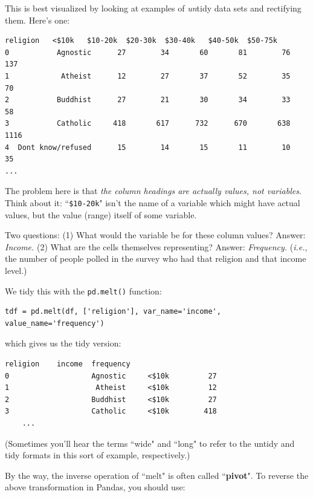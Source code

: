 \documentclass[12pt]{article}
\begin{document}
\vspace{.2in}
This is best visualized by looking at examples of \textit{un}tidy data sets
and rectifying them. Here's one:
\small
\begin{Verbatim}[fontsize=small,samepage=true,frame=none]
            religion   <$10k   $10-20k  $20-30k  $30-40k   $40-50k  $50-75k
0           Agnostic      27        34       60       81        76      137
1            Atheist      12        27       37       52        35       70
2           Buddhist      27        21       30       34        33       58
3           Catholic     418       617      732      670       638     1116
4  Dont know/refused      15        14       15       11        10       35
...
\end{Verbatim}
\normalsize

The problem here is that \textit{the column headings are actually values, not
variables}. Think about it: ``\texttt{\$10-20k}" isn't the name of a variable
which might have actual values, but the value (range) itself of some variable.

Two questions: (1) What would the variable be for these column values? Answer:
\textit{Income.} (2) What are the cells themselves representing? Answer:
\textit{Frequency.} (\textit{i.e.}, the number of people polled in the survey
who had that religion and that income level.)

We tidy this with the \texttt{pd.melt()} function:

\begin{Verbatim}[fontsize=small,samepage=true,frame=none]
tdf = pd.melt(df, ['religion'], var_name='income', value_name='frequency')
\end{Verbatim}

which gives us the tidy version:
\begin{Verbatim}[fontsize=small,samepage=true,frame=none]
                    religion    income  frequency
0                   Agnostic     <$10k         27
1                    Atheist     <$10k         12
2                   Buddhist     <$10k         27
3                   Catholic     <$10k        418
    ...
\end{Verbatim}
(Sometimes you'll hear the terms ``wide" and ``long" to refer to the untidy
and tidy formats in this sort of example, respectively.)

\vspace{.1in}
By the way, the inverse operation of ``melt" is often called
``\textbf{pivot}". To reverse the above transformation in Pandas, you should
use:
\end{document}
